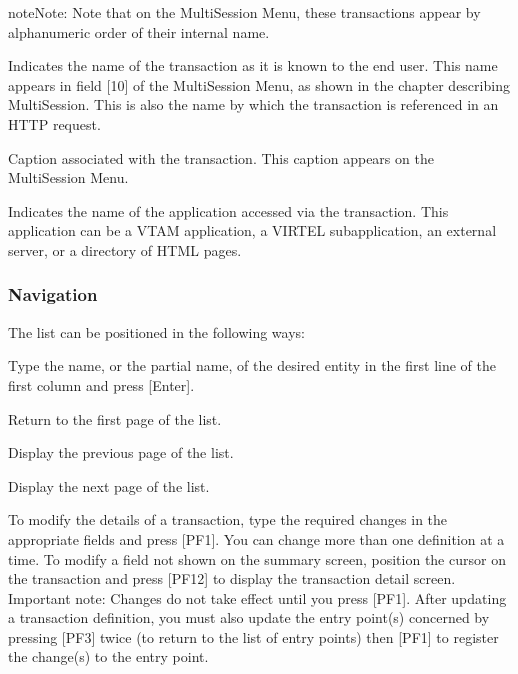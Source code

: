 \documentclass[letterpaper,10pt,english]{sphinxmanual}
\begin{document}
\begin{sphinxadmonition}{note}{Note:}
\sphinxAtStartPar
Note that on the Multi\sphinxhyphen{}Session Menu, these transactions appear by alphanumeric order of their internal name.
\end{sphinxadmonition}
\begin{description}
\sphinxAtStartPar
Indicates the name of the transaction as it is known to the end user. This name appears in field {[}10{]} of the Multi\sphinxhyphen{}Session Menu, as shown in the chapter describing Multi\sphinxhyphen{}Session. This is also the name by which the transaction is referenced in an HTTP request.

\sphinxAtStartPar
Caption associated with the transaction. This caption appears on the Multi\sphinxhyphen{}Session Menu.

\sphinxAtStartPar
Indicates the name of the application accessed via the transaction. This application can be a VTAM application, a VIRTEL sub\sphinxhyphen{}application, an external server, or a directory of HTML pages.

\end{description}


\subsubsection{Navigation}
\label{\detokenize{connectivity_guide:id63}}
\sphinxAtStartPar
The list can be positioned in the following ways:
\begin{description}
\sphinxAtStartPar
Type the name, or the partial name, of the desired entity in the first line of the first column and press {[}Enter{]}.

\sphinxlineitem{{[}PF6{]}}
\sphinxAtStartPar
Return to the first page of the list.

\sphinxlineitem{{[}PF7{]}}
\sphinxAtStartPar
Display the previous page of the list.

\sphinxlineitem{{[}PF8{]}}
\sphinxAtStartPar
Display the next page of the list.

\end{description}

\sphinxAtStartPar
{} \sphinxhyphen{} To modify the details of a transaction, type the required changes in the appropriate fields and press {[}PF1{]}. You can change more than one definition at a time. To modify a field not shown on the summary screen, position the cursor on the transaction and press {[}PF12{]} to display the transaction detail screen. Important note: Changes do not take effect until you press {[}PF1{]}. After updating a transaction definition, you must also update the entry point(s) concerned by pressing {[}PF3{]} twice (to return to the list of entry points) then {[}PF1{]} to register the change(s) to the entry point.
\end{document}
